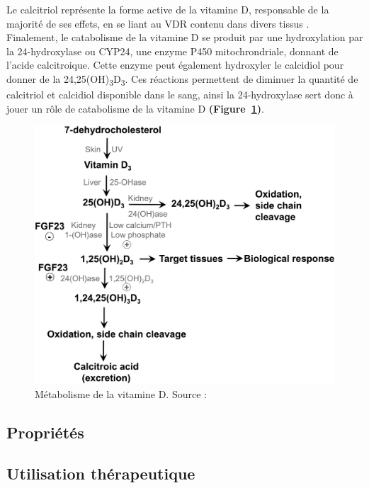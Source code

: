 \documentclass[
  letterpaper,
  DIV=11,
  numbers=noendperiod]{scrartcl}
\begin{document}
Le calcitriol représente la forme active de la vitamine D, responsable
de la majorité de ses effets, en se liant au VDR contenu dans divers
tissus \autocite{Norman.2008}. Finalement, le catabolisme de la vitamine
D se produit par une hydroxylation par la 24-hydroxylase ou CYP24, une
enzyme P450 mitochrondriale, donnant de l'acide calcitroique. Cette
enzyme peut également hydroxyler le calcidiol pour donner de la
24,25(OH)\textsubscript{3}D\textsubscript{3}. Ces réactions permettent
de diminuer la quantité de calcitriol et calcidiol disponible dans le
sang, ainsi la 24-hydroxylase sert donc à jouer un rôle de catabolisme
de la vitamine D \textbf{(Figure~\ref{fig-metabolism-vitd})}.

\begin{figure}

{\centering \includegraphics{figures/vitamin-d-metabolism.png}

}

\caption{\label{fig-metabolism-vitd}Métabolisme de la vitamine D. Source
: \textcite{Norman.2008}}

\end{figure}

\hypertarget{propriuxe9tuxe9s}{%
\subsection{Propriétés}\label{propriuxe9tuxe9s}}

\hypertarget{utilisation-thuxe9rapeutique}{%
\subsection{Utilisation
thérapeutique}\label{utilisation-thuxe9rapeutique}}
\end{document}
